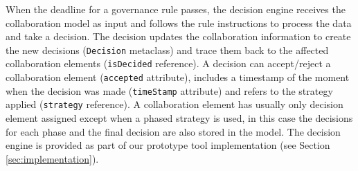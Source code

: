 When the deadline for a governance rule passes, the decision engine receives the collaboration model as input and follows the rule instructions to process the data and take a decision. The decision updates the collaboration information to create the new decisions (\texttt{Decision} metaclass) and trace them back to the affected collaboration elements (\texttt{isDecided} reference). A decision can accept/reject a collaboration element (\texttt{accepted} attribute), includes a timestamp of the moment when the decision was made (\texttt{timeStamp} attribute) and refers to the strategy applied (\texttt{strategy} reference). A collaboration element has usually only decision element assigned except when a phased strategy is used, in this case the decisions for each phase and the final decision are also stored in the model. The decision engine is provided as part of our prototype tool implementation (see Section \ref{sec:implementation}).

